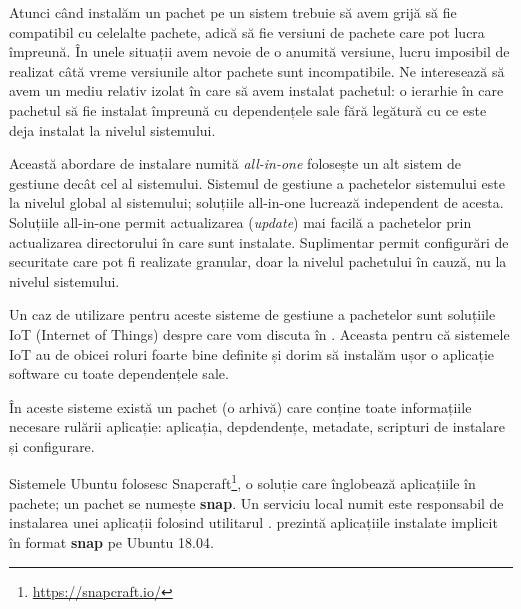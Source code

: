 Atunci când instalăm un pachet pe un sistem trebuie să avem grijă să fie compatibil cu celelalte pachete, adică să fie versiuni de pachete care pot lucra împreună. În unele situații avem nevoie de o anumită versiune, lucru imposibil de realizat câtă vreme versiunile altor pachete sunt incompatibile. Ne interesează să avem un mediu relativ izolat în care să avem instalat pachetul: o ierarhie în care pachetul să fie instalat împreună cu dependențele sale fără legătură cu ce este deja instalat la nivelul sistemului.

Această abordare de instalare numită \textit{all-in-one} folosește un alt sistem de gestiune decât cel al sistemului. Sistemul de gestiune a pachetelor sistemului este la nivelul global al sistemului; soluțiile all-in-one lucrează independent de acesta. Soluțiile all-in-one permit actualizarea (\textit{update}) mai facilă a pachetelor prin actualizarea directorului în care sunt instalate. Suplimentar permit configurări de securitate care pot fi realizate granular, doar la nivelul pachetului în cauză, nu la nivelul sistemului.

Un caz de utilizare pentru aceste sisteme de gestiune a pachetelor sunt soluțiile IoT (Internet of Things) despre care vom discuta în . Aceasta pentru că sistemele IoT au de obicei roluri foarte bine definite și dorim să instalăm ușor o aplicație software cu toate dependențele sale.

În aceste sisteme există un pachet (o arhivă) care conține toate informațiile necesare rulării aplicație: aplicația, depdendențe, metadate, scripturi de instalare și configurare.

Sistemele Ubuntu folosesc Snapcraft\footnote{\url{https://snapcraft.io/}}, o soluție care înglobează aplicațiile în pachete; un pachet se numește \textbf{snap}. Un serviciu local numit  este responsabil de instalarea unei aplicații folosind utilitarul .  prezintă aplicațiile instalate implicit în format \textbf{snap} pe Ubuntu 18.04.


